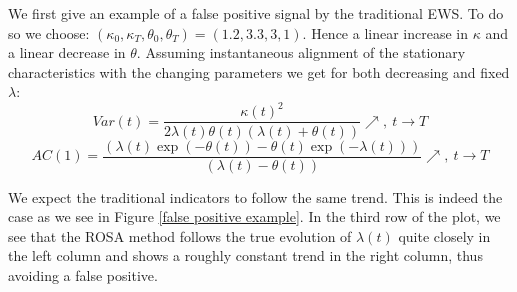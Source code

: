 \documentclass[%
thesis=student,%
coverpage=false,%
titlepage=false,%
headmarks=true, %
english,%
font=libertine, %
math=newpxtx, %
BCOR=5mm,%
coverBCOR=11mm%
]{tumbook}
\begin{document}
We first give an example of a false positive signal by the traditional EWS. To do so we choose: $(\kappa_{0},\kappa_{T},\theta_{0},\theta_{T}) = (1.2,3.3,3,1)$. Hence a linear increase in $\kappa$ and a linear decrease in $\theta$. Assuming instantaneous alignment of the stationary characteristics with the changing parameters we get for both decreasing and fixed $\lambda$: 
\[
Var(t) = \frac{\kappa(t)^2}{2\lambda(t)\theta(t)(\lambda(t) + \theta(t))} \nearrow, \ t \rightarrow T
\]
\[
AC(1) = \frac{(\lambda(t)\exp(-\theta(t))-\theta(t)\exp(-\lambda(t)))}{(\lambda(t)-\theta(t))} \nearrow, \ t \rightarrow T
\]

We expect the traditional indicators to follow the same trend. This is indeed the case as we see in Figure \ref{false positive example}. In the third row of the plot, we see that the ROSA method follows the true evolution of $\lambda(t)$ quite closely in the left column and shows a roughly constant trend in the right column, thus avoiding a false positive.
\end{document}
